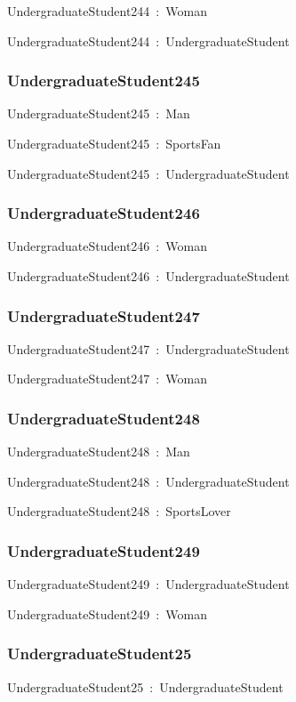 \documentclass{article}
\begin{document}
UndergraduateStudent244~:~Woman

UndergraduateStudent244~:~UndergraduateStudent

\subsubsection*{UndergraduateStudent245}

UndergraduateStudent245~:~Man

UndergraduateStudent245~:~SportsFan

UndergraduateStudent245~:~UndergraduateStudent

\subsubsection*{UndergraduateStudent246}

UndergraduateStudent246~:~Woman

UndergraduateStudent246~:~UndergraduateStudent

\subsubsection*{UndergraduateStudent247}

UndergraduateStudent247~:~UndergraduateStudent

UndergraduateStudent247~:~Woman

\subsubsection*{UndergraduateStudent248}

UndergraduateStudent248~:~Man

UndergraduateStudent248~:~UndergraduateStudent

UndergraduateStudent248~:~SportsLover

\subsubsection*{UndergraduateStudent249}

UndergraduateStudent249~:~UndergraduateStudent

UndergraduateStudent249~:~Woman

\subsubsection*{UndergraduateStudent25}

UndergraduateStudent25~:~UndergraduateStudent
\end{document}
